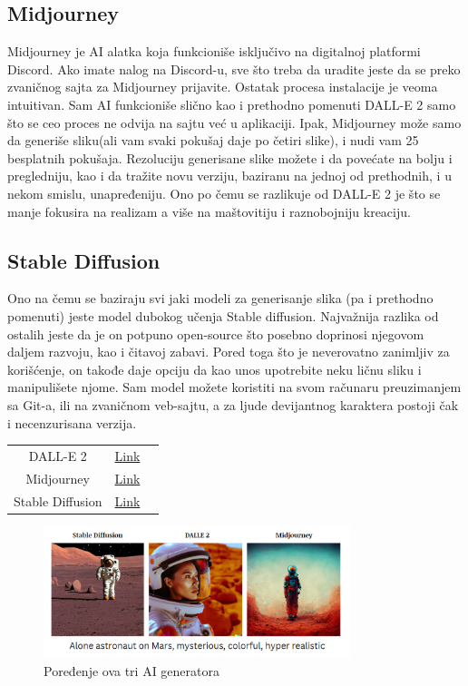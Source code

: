 \documentclass[12pt, letterpaper]{article}
\begin{document}
\subsection{Midjourney}
Midjourney je AI alatka koja funkcioniše isključivo na digitalnoj platformi Discord. Ako imate nalog na Discord-u, sve što treba da uradite jeste da se preko zvaničnog sajta za Midjourney prijavite. Ostatak procesa instalacije je veoma intuitivan. Sam  AI funkcioniše slično kao i prethodno pomenuti DALL-E 2 samo što se ceo proces ne odvija na sajtu već u aplikaciji. Ipak,  Midjourney može samo da generiše sliku(ali vam svaki pokušaj daje po četiri slike), i nudi vam 25 besplatnih pokušaja. Rezoluciju generisane slike možete i da povećate na bolju i pregledniju, kao i da tražite novu verziju, baziranu na jednoj od  prethodnih, i u nekom smislu, unapređeniju. Ono po čemu se razlikuje od DALL-E 2 je što se manje fokusira na realizam a više na maštovitiju i raznobojniju kreaciju.
\subsection{Stable Diffusion}
Ono na čemu se baziraju svi jaki modeli za generisanje slika (pa i prethodno pomenuti) jeste model dubokog učenja Stable diffusion. Najvažnija razlika od ostalih jeste da je on potpuno open-source što posebno doprinosi njegovom daljem razvoju, kao i čitavoj zabavi. Pored toga što je neverovatno zanimljiv za korišćenje, on takođe daje opciju da kao unos upotrebite neku ličnu sliku i manipulišete njome. Sam model možete koristiti na svom računaru preuzimanjem sa Git-a, ili na zvaničnom veb-sajtu, a za ljude devijantnog karaktera postoji čak i necenzurisana verzija.
\begin{center}
\begin{tabular}{ |c|c|c| } 
 \hline
 DALL-E 2 & \href{https://openai.com/dall-e-2/}{Link} \\
 Midjourney & \href{https://www.midjourney.com/}{Link} \\
 Stable Diffusion & \href{https://beta.dreamstudio.ai/dream}{Link} \\
 \hline
\end{tabular}
\end{center}

\begin{figure}[htp]
\centering
\includegraphics[width=0.8\textwidth]{astronaut.png}
\caption{Poređenje ova tri AI generatora}
\label{fig: Astronaut}
\end{figure}
\end{document}
